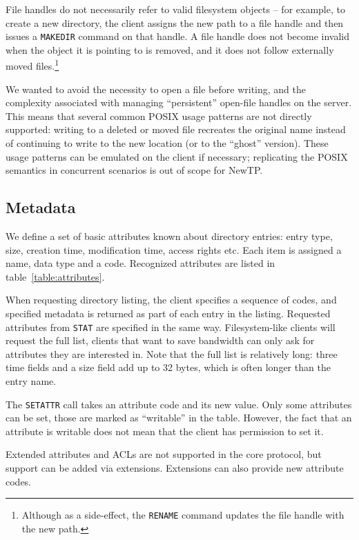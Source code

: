 File handles do not necessarily refer to valid filesystem objects -- for example, to create a new directory,
the client assigns the new path to a file handle and then issues a {\tt MAKEDIR} command on that handle.
A file handle does not become invalid when the object it is pointing to is removed, and it does not follow
externally moved files.\footnote{Although as a side-effect, the {\tt RENAME} command updates the file handle
with the new path.}

We wanted to avoid the necessity to open a file before writing, and the complexity associated with managing
``persistent'' open-file handles on the server. This means that several common POSIX usage patterns are not
directly supported: writing to a deleted or moved file recreates the original name instead of continuing to
write to the new location (or to the ``ghost'' version). These usage patterns can be emulated on the client if
necessary; replicating the POSIX semantics in concurrent scenarios is out of scope for NewTP.

%

\subsection{Metadata}

We define a set of basic attributes known about directory entries: entry type, size, creation time,
modification time, access rights etc. Each item is assigned a name, data type and a code. Recognized
attributes are listed in table~\ref{table:attributes}.

When requesting directory listing, the client specifies a sequence of codes, and specified metadata is
returned as part of each entry in the listing. Requested attributes from {\tt STAT} are specified in the same
way. Filesystem-like clients will request the full list, clients that want to save bandwidth can only ask for
attributes they are interested in.  Note that the full list is relatively long: three time fields and a size
field add up to 32 bytes, which is often longer than the entry name.

The {\tt SETATTR} call takes an attribute code and its new value. Only some attributes can be set, those are
marked as ``writable'' in the table. However, the fact that an attribute is writable does not mean that the
client has permission to set it.

Extended attributes and ACLs are not supported in the core protocol, but support can be added via extensions.
Extensions can also provide new attribute codes.

